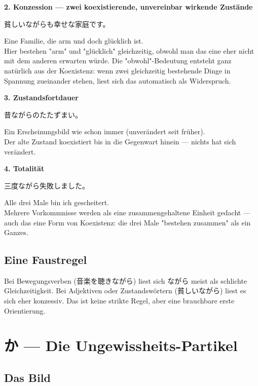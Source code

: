 \documentclass[12pt]{book}
\begin{document}
\textbf{2. Konzession — zwei koexistierende, unvereinbar wirkende Zustände}
\par\quad 貧しいながらも幸せな家庭です。\\
\par\quad Eine Familie, die arm und doch glücklich ist.\\

Hier bestehen "arm" und "glücklich" gleichzeitig, obwohl man das eine eher nicht mit dem anderen erwarten würde. Die "obwohl"-Bedeutung entsteht ganz natürlich aus der Koexistenz: wenn zwei gleichzeitig bestehende Dinge in Spannung zueinander stehen, liest sich das automatisch als Widerspruch.

\textbf{3. Zustandsfortdauer}
\par\quad 昔ながらのたたずまい。\\
\par\quad Ein Erscheinungsbild wie schon immer (unverändert seit früher).\\

Der alte Zustand koexistiert bis in die Gegenwart hinein — nichts hat sich verändert.

\textbf{4. Totalität}
\par\quad 三度ながら失敗しました。\\
\par\quad Alle drei Male bin ich gescheitert.\\

Mehrere Vorkommnisse werden als eine zusammengehaltene Einheit gedacht — auch das eine Form von Koexistenz: die drei Male "bestehen zusammen" als ein Ganzes.

\section*{Eine Faustregel}

Bei Bewegungsverben (音楽を聴きながら) liest sich ながら meist als schlichte Gleichzeitigkeit. Bei Adjektiven oder Zustandswörtern (貧しいながら) liest es sich eher konzessiv. Das ist keine strikte Regel, aber eine brauchbare erste Orientierung.


\chapter{か — Die Ungewissheits-Partikel}

\section*{Das Bild}
\end{document}
